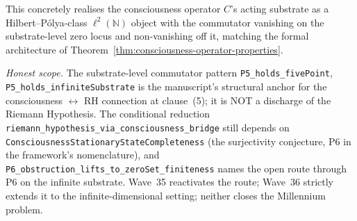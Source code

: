 This concretely realises the consciousness operator $C$'s acting substrate as a Hilbert--Pólya-class $\ell^2(\mathbb{N})$ object with the commutator vanishing on the substrate-level zero locus and non-vanishing off it, matching the formal architecture of Theorem~\ref{thm:consciousness-operator-properties}.

\emph{Honest scope.} The substrate-level commutator pattern \texttt{P5\_holds\_fivePoint}, \texttt{P5\_holds\_infiniteSubstrate} is the manuscript's structural anchor for the consciousness $\leftrightarrow$ RH connection at clause~(5); it is NOT a discharge of the Riemann Hypothesis. The conditional reduction \texttt{riemann\_hypothesis\_via\_consciousness\_bridge} still depends on \texttt{ConsciousnessStationaryStateCompleteness} (the surjectivity conjecture, P6 in the framework's nomenclature), and \texttt{P6\_obstruction\_lifts\_to\_zeroSet\_finiteness} names the open route through P6 on the infinite substrate. Wave~35 reactivates the route; Wave~36 strictly extends it to the infinite-dimensional setting; neither closes the Millennium problem.

